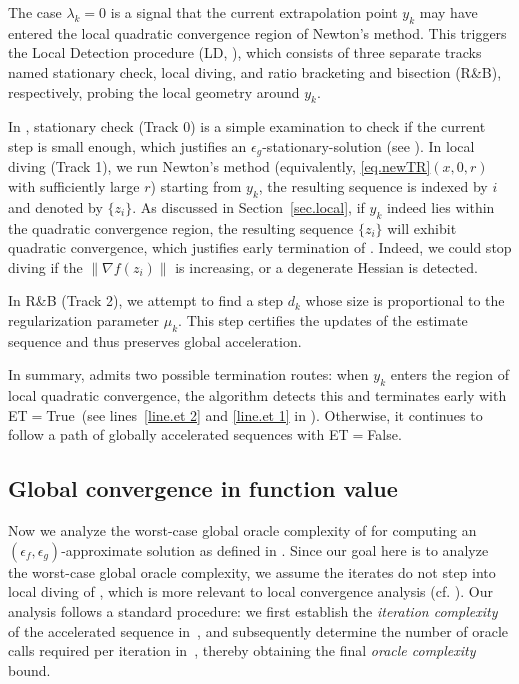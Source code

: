 \documentclass{article}
\begin{document}
The case $\lambda_k = 0$ is a signal that the current extrapolation point $y_k$ may have entered the local quadratic convergence region of Newton's method. This triggers the Local Detection procedure (LD, ), which consists of three separate tracks named stationary check, local diving, and ratio bracketing and bisection (R\&B), respectively, probing the local geometry around $y_k$.

In , stationary check ({Track 0}) is a simple examination to check if the current step is small enough, which justifies an $\epsilon_g$-stationary-solution (see ).
In local diving ({Track 1}), we run Newton's method (equivalently, \ref{eq.newTR}$(x, 0, r)$ with sufficiently large $r$) starting from $y_k$, the resulting sequence is indexed by $i$ and denoted by $\{z_i\}$. As discussed in Section~\ref{sec.local}, if $y_k$ indeed lies within the quadratic convergence region, the resulting sequence $\{z_i\}$ will exhibit quadratic convergence, which justifies early termination of . Indeed, we could stop diving if the $\|\nabla f(z_i)\|$ is increasing, or a degenerate Hessian is detected.

In R\&B ({Track 2}), we attempt to find a step $d_k$ whose size is proportional to the regularization parameter $\mu_k$. This step certifies the updates of the estimate sequence and thus preserves global acceleration.

In summary,  admits two possible termination routes: when $y_k$ enters the region of local quadratic convergence, the algorithm detects this and terminates early with ET$=$True~(see lines~\ref{line.et 2} and \ref{line.et 1} in ). Otherwise, it continues to follow a path of globally accelerated sequences with ET$=$False.

\subsection{Global convergence in function value}
Now we analyze the worst-case global oracle complexity of  for computing an $(\epsilon_f,\epsilon_g)$-approximate solution as defined in . Since our goal here is to analyze the worst-case global oracle complexity, we assume the iterates do not step into local diving of , which is more relevant to local convergence analysis (cf. ). Our analysis follows a standard procedure: we first establish the \textit{iteration complexity} of the accelerated sequence in~, and subsequently determine the number of oracle calls required per iteration in~, thereby obtaining the final \textit{oracle complexity} bound.
\end{document}
